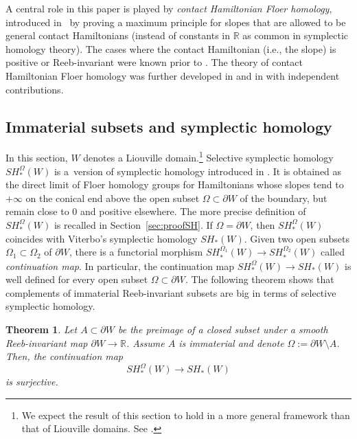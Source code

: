 \documentclass[10pt,a4paper]{amsart}
\numberwithin{equation}{section}
\newtheorem{Theorem}{Theorem}
\theoremstyle{definition}
\begin{document}
{A central role in this paper is played by \emph{contact Hamiltonian Floer homology}, introduced in~\cite{merry2019maximum} by proving a maximum principle for slopes that are allowed to be general contact Hamiltonians (instead of constants in $\mathbb{R}$ as common in symplectic homology theory). The cases where the contact Hamiltonian (i.e., the slope) is positive \cite{seidel2008biased} or Reeb-invariant \cite{ritter2016circle} were known prior to \cite{merry2019maximum}. The theory of contact Hamiltonian Floer homology was further developed in \cite{djordjevic2023quantitative, uljarevic2022hamiltonian} and in \cite{cant2023shelukhin, cant2024remarks} with independent contributions.}

\subsection{Immaterial subsets and symplectic homology}

In this section, $W$ denotes a Liouville domain.\footnote{We expect the result of this section to hold in a more general framework than that of Liouville domains. See \cite[Remark~1.5]{uljarevic2023selective}.} Selective symplectic homology $SH_\ast^\Omega(W)$ is a~version of symplectic homology introduced in \cite{uljarevic2023selective}. It is obtained as the direct limit of Floer homology groups for Hamiltonians whose slopes tend to $+\infty$ on the conical end above the open subset $\Omega\subset \partial W $ of the boundary, but remain close to 0 and positive elsewhere. The more precise definition of $SH_\ast^\Omega(W)$ is recalled in Section~\ref{sec:proofSH}.
If $\Omega=\partial W$, then $SH^\Omega_\ast(W)$ coincides with Viterbo's {\cite{viterbo1999functors}} symplectic homology $SH_\ast(W)$. Given two open subsets $\Omega_1\subset \Omega_2$ of $\partial W$, there is a functorial morphism $SH^{\Omega_1}_\ast(W)\to SH^{\Omega_2}_\ast(W)$ called \emph{continuation map}. In particular, the continuation map $SH_\ast^\Omega(W)\to SH_\ast(W)$ is well defined for every open subset $\Omega\subset\partial W$.
The following theorem shows that complements of immaterial Reeb-invariant subsets are big in terms of selective symplectic homology.


\begin{Theorem}\label{thm:complement-big}
Let $A\subset \partial W$ be the preimage of a closed subset under a smooth Reeb-invariant map {$\partial W\to\mathbb{R}$}. Assume $A$ is immaterial and denote $\Omega:=\partial W\setminus A$. Then, the continuation map
\begin{equation*}SH^{\Omega}_\ast(W)\to SH_\ast(W)\end{equation*}
is surjective.
\end{Theorem}
\end{document}
